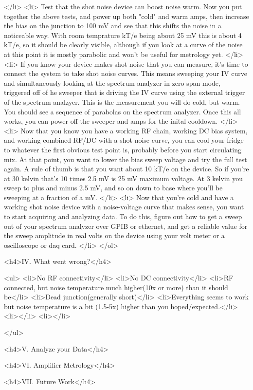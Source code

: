 \documentclass[11pt]{article}
\begin{document}
    </li>
    <li>
        Test that the shot noise device can boost noise warm.  Now you put together the above tests, and power up both "cold" and warm amps, then increase the bias on the junction to 100 mV and see that this shifts the noise in a noticeable way.  With room temprature kT/e being about 25 mV this is about 4 kT/e, so it should be clearly visible, although if you look at a curve of the noise at this point it is mostly parabolic and won't be useful for metrology yet. 
    </li>
    <li>
        If you know your device makes shot noise that you can measure, it's time to connect the system to take shot noise curves.  This means sweeping your IV curve and simultaneously looking at the spectrum analyzer in zero span mode, triggered off of he sweeper that is driving the IV curve using the external trigger of the spectrum analzyer.  This is the measurement you will do cold, but warm.  You should see a sequence of parabolas on the spectrum analyzer.  Once this all works, you can power off the sweeper and amps for the inital cooldown.
    </li>
    <li>
        Now that you know you have a working RF chain, working DC bias system, and working combined RF/DC with a shot noise curve, you can cool your fridge to whatever the first obvious test point is, probably before you start circulating mix.  At that point, you want to lower the bias sweep voltage and try the full test again.  A rule of thumb is that you want about 10 kT/e on the device.  So if you're at 30 kelvin that's 10 times 2.5 mV is 25 mV maximum voltage.  At 3 kelvin you sweep to plus and minus 2.5 mV, and so on down to base where you'll be sweeping at a fraction of a mV.  
    </li>
    <li>
        Now that you're cold and have a working shot noise device with a noise-voltage curve that makes sense, you want to start acquiring and analyzing data.  To do this, figure out how to get a sweep out of your spectrum analyzer over GPIB or ethernet, and get a reliable value for the sweep amplitude in real volts on the device using your volt meter or a oscilloscope or daq card.
    </li>
</ol>

<h4>IV. What went wrong?</h4>

<ul>
<li>No RF connectivity</li>
<li>No DC connectivity</li>
<li>RF connected, but noise temperature much higher(10x or more) than it should be</li>
<li>Dead junction(generally short)</li>
<li>Everything seems to work but noise temperature is a bit (1.5-5x) higher than you hoped/expected.</li>
<li></li>
<li></li>

</ul>

<h4>V. Analyze your Data</h4>

<h4>VI. Amplifier Metrology</h4>

<h4>VII. Future Work</h4>
\end{document}
